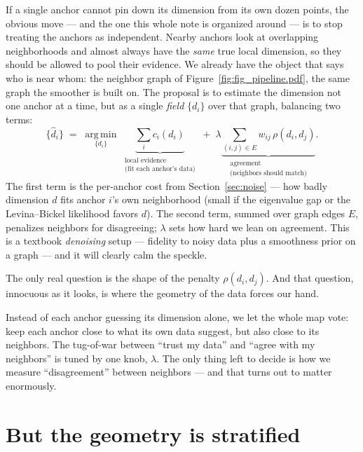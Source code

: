 \documentclass[11pt]{article}
\theoremstyle{definition}
\theoremstyle{remark}
\newcommand{\argmin}{\operatorname*{arg\,min}}
\begin{document}
If a single anchor cannot pin down its dimension from its own dozen points, the
obvious move --- and the one this whole note is organized around --- is to stop
treating the anchors as independent. Nearby anchors look at overlapping
neighborhoods and almost always have the \emph{same} true local dimension, so they
should be allowed to pool their evidence. We already have the object that says who
is near whom: the neighbor graph of Figure~\ref{fig:fig_pipeline.pdf}, the same
graph the smoother is built on. The proposal is to estimate the dimension not one
anchor at a time, but as a single \emph{field} $\{d_i\}$ over that graph,
balancing two terms:
\begin{equation}\label{eq:field}
  \{\widehat d_i\} \;=\; \argmin_{\{d_i\}}\;
  \underbrace{\sum_i c_i(d_i)}_{\substack{\text{local evidence}\\\text{(fit each anchor's data)}}}
  \;+\;\lambda
  \underbrace{\sum_{(i,j)\in E} w_{ij}\,\rho(d_i, d_j)}_{\substack{\text{agreement}\\\text{(neighbors should match)}}} .
\end{equation}
The first term is the per-anchor cost from Section~\ref{sec:noise} --- how badly
dimension $d$ fits anchor $i$'s own neighborhood (small if the eigenvalue gap or
the Levina--Bickel likelihood favors $d$). The second term, summed over graph
edges $E$, penalizes neighbors for disagreeing; $\lambda$ sets how hard we lean on
agreement. This is a textbook \emph{denoising} setup --- fidelity to noisy data
plus a smoothness prior on a graph --- and it will clearly calm the speckle.

The only real question is the shape of the penalty $\rho(d_i, d_j)$. And that
question, innocuous as it looks, is where the geometry of the data forces our
hand.

\begin{plain}
Instead of each anchor guessing its dimension alone, we let the whole map vote:
keep each anchor close to what its own data suggest, but also close to its
neighbors. The tug-of-war between ``trust my data'' and ``agree with my
neighbors'' is tuned by one knob, $\lambda$. The only thing left to decide is how
we measure ``disagreement'' between neighbors --- and that turns out to matter
enormously.
\end{plain}

\section{But the geometry is stratified}\label{sec:strat}
\end{document}
